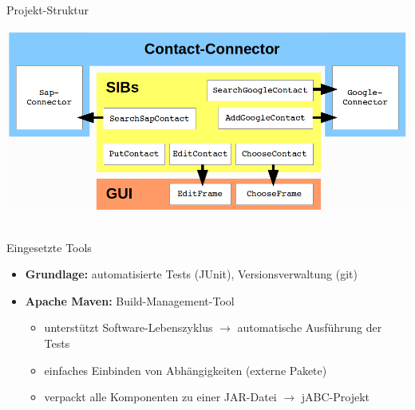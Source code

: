 \begin{frame}{Projekt-Struktur}
	
\begin{center}
\includegraphics[width=\textheight]{Bilder/projekt_aufbau.png} 
\end{center}

\end{frame}


\subsection*{}
\begin{frame}{Eingesetzte Tools}
\begin{itemize}
	
	\item \textbf{Grundlage:} automatisierte Tests (JUnit), Versionsverwaltung (git)
	\pause
	\item \textbf{Apache Maven:} Build-Management-Tool
		\begin{itemize}
			
			\item unterstützt Software-Lebenszyklus $\rightarrow$ automatische Ausführung der Tests
			\item einfaches Einbinden von Abhängigkeiten (externe Pakete)
			\item verpackt alle Komponenten zu einer JAR-Datei $\rightarrow$ jABC-Projekt
		\end{itemize}
\end{itemize}

\end{frame}











